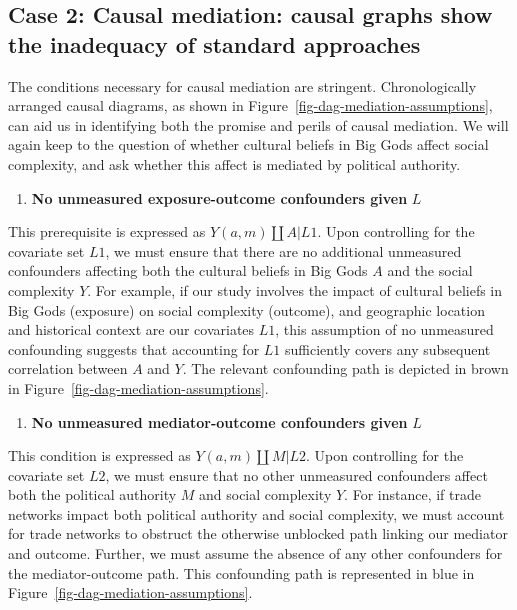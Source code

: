 \documentclass[
  singlecolumn]{report}
\providecommand{\tightlist}{%
  \setlength{\itemsep}{0pt}\setlength{\parskip}{0pt}}\usepackage{longtable,booktabs,array}
\begin{document}
\hypertarget{case-2-causal-mediation-causal-graphs-show-the-inadequacy-of-standard-approaches}{%
\subsection{Case 2: Causal mediation: causal graphs show the inadequacy
of standard
approaches}\label{case-2-causal-mediation-causal-graphs-show-the-inadequacy-of-standard-approaches}}

The conditions necessary for causal mediation are stringent.
Chronologically arranged causal diagrams, as shown in
Figure~\ref{fig-dag-mediation-assumptions}, can aid us in identifying
both the promise and perils of causal mediation. We will again keep to
the question of whether cultural beliefs in Big Gods affect social
complexity, and ask whether this affect is mediated by political
authority.

\begin{enumerate}
\def\labelenumi{\arabic{enumi}.}
\tightlist
\item
  \textbf{No unmeasured exposure-outcome confounders given} \(L\)
\end{enumerate}

This prerequisite is expressed as \(Y(a,m) \coprod A | L1\). Upon
controlling for the covariate set \(L1\), we must ensure that there are
no additional unmeasured confounders affecting both the cultural beliefs
in Big Gods \(A\) and the social complexity \(Y\). For example, if our
study involves the impact of cultural beliefs in Big Gods (exposure) on
social complexity (outcome), and geographic location and historical
context are our covariates \(L1\), this assumption of no unmeasured
confounding suggests that accounting for \(L1\) sufficiently covers any
subsequent correlation between \(A\) and \(Y\). The relevant confounding
path is depicted in brown in Figure~\ref{fig-dag-mediation-assumptions}.

\begin{enumerate}
\def\labelenumi{\arabic{enumi}.}
\setcounter{enumi}{1}
\tightlist
\item
  \textbf{No unmeasured mediator-outcome confounders given} \(L\)
\end{enumerate}

This condition is expressed as \(Y(a,m) \coprod M | L2\). Upon
controlling for the covariate set \(L2\), we must ensure that no other
unmeasured confounders affect both the political authority \(M\) and
social complexity \(Y\). For instance, if trade networks impact both
political authority and social complexity, we must account for trade
networks to obstruct the otherwise unblocked path linking our mediator
and outcome. Further, we must assume the absence of any other
confounders for the mediator-outcome path. This confounding path is
represented in blue in Figure~\ref{fig-dag-mediation-assumptions}.
\end{document}
